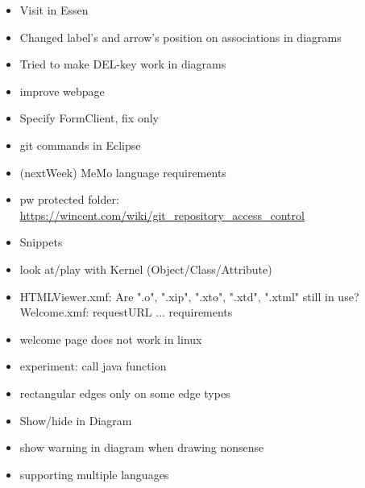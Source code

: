 \begin{itemize} 
\item Visit in Essen
\end{itemize}

\begin{itemize} 
\item Changed label's and arrow's position on associations in diagrams
\item Tried to make DEL-key work in diagrams
\end{itemize}

\begin{itemize}
\item improve webpage
\item Specify FormClient, fix only
\item git commands in Eclipse
\item (nextWeek) MeMo language requirements
\item pw protected folder: \url{https://wincent.com/wiki/git_repository_access_control}
\item Snippets
\item look at/play with Kernel (Object/Class/Attribute)
\item HTMLViewer.xmf: Are ".o", ".xip", ".xto", ".xtd", ".xtml" still in use?
Welcome.xmf: requestURL ...
requirements
\item welcome page does not work in linux
\item experiment: call java function
\item rectangular edges only on some edge types
\item Show/hide in Diagram
\item show warning in diagram when drawing nonsense
\item supporting multiple languages
\end{itemize}

